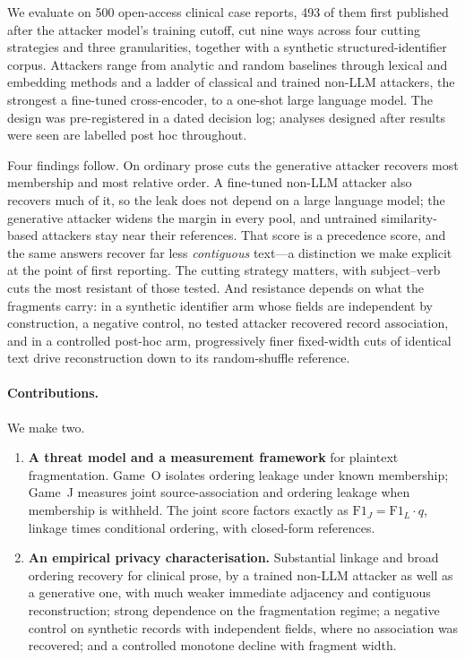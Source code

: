 \documentclass[sigconf,review]{acmart}
\newcommand{\FJ}{\ensuremath{\mathrm{F1}_{J}}}
\newcommand{\FL}{\ensuremath{\mathrm{F1}_{L}}}
\begin{document}
We evaluate on 500 open-access clinical case reports, 493 of them first
published after the attacker model's training cutoff, cut nine ways across
four cutting strategies and three granularities, together with a synthetic
structured-identifier corpus. Attackers range from analytic and random
baselines through lexical and embedding methods and a ladder of classical and
trained non-LLM attackers, the strongest a fine-tuned cross-encoder, to a
one-shot large language model. The design was pre-registered in a dated
decision log; analyses designed after results were seen are labelled post hoc
throughout.

Four findings follow. On ordinary prose cuts the generative attacker recovers
most membership and most relative order. A fine-tuned non-LLM attacker also
recovers much of it, so the leak does not depend on a large language model;
the generative attacker widens the margin in every pool, and untrained
similarity-based attackers stay near their references. That score is a
precedence score, and the
same answers recover far less \emph{contiguous} text---a distinction we make
explicit at the point of first reporting. The cutting strategy matters, with
subject--verb cuts the most resistant of those tested. And resistance depends
on what the fragments carry: in a synthetic identifier arm whose fields are
independent by construction, a negative control, no tested attacker recovered
record association, and in a controlled post-hoc arm, progressively finer
fixed-width cuts of identical text drive reconstruction down to its
random-shuffle reference.

\paragraph{Contributions.} We make two.

\begin{enumerate}
\item \textbf{A threat model and a measurement framework} for plaintext
fragmentation. Game~O isolates ordering leakage under known membership; Game~J
measures joint source-association and ordering leakage when membership is
withheld. The joint score factors exactly as $\FJ = \FL \cdot q$, linkage times
conditional ordering, with closed-form references.

\item \textbf{An empirical privacy characterisation.} Substantial linkage and
broad ordering recovery for clinical prose, by a trained non-LLM attacker as
well as a generative one, with much weaker immediate adjacency and contiguous
reconstruction; strong dependence on the fragmentation regime; a negative
control on synthetic records with independent fields, where no association
was recovered; and a controlled monotone decline with fragment width.
\end{enumerate}
\end{document}
